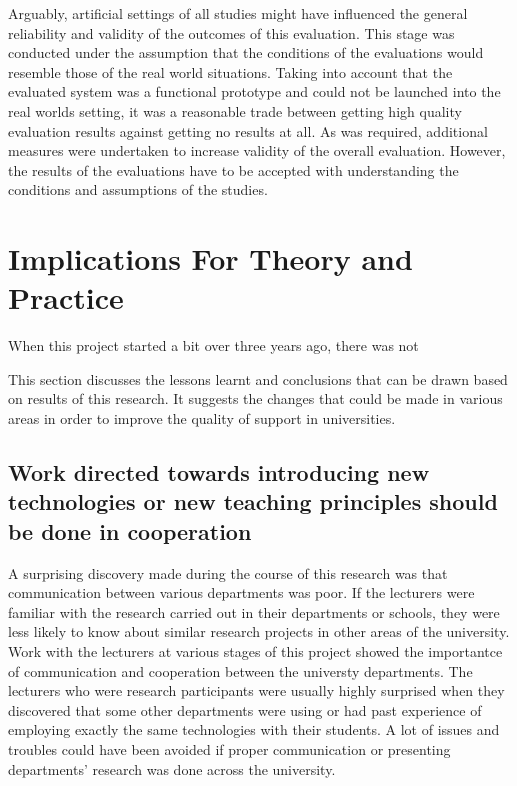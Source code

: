 Arguably, artificial settings of all studies might have influenced the general
reliability and validity of the outcomes of this evaluation. This stage was
conducted under the assumption that the conditions of the evaluations would
resemble those of the real world situations. Taking into account that the
evaluated system was a functional prototype and could not be launched into the
real worlds setting, it was a reasonable trade between getting high quality
evaluation results against getting no results at all. As was required,
additional measures were undertaken to increase validity of the overall
evaluation. However, the results of the evaluations have to be accepted with
understanding the conditions and assumptions of the studies.

\section{Implications For Theory and Practice}

When this project started a bit over three years ago, there was not 


This section discusses the lessons learnt and conclusions that can be drawn
based on results of this research. It suggests the changes that could be made in
various areas in order to improve the quality of \LLLs support in universities.

\subsection[Cooperation and Communication]{Work directed towards introducing
new technologies or new teaching principles should be done in cooperation}

A surprising discovery made during the course of this research was that
communication between various departments was poor. If the lecturers were
familiar with the research carried out in their departments or schools, they
were less likely to know about similar research projects in other areas of
the university. Work with the lecturers at various stages of this project showed
the importantce of communication and cooperation between the universty
departments. The lecturers who were research participants were usually highly
surprised when they discovered that some other departments were using or had
past experience of employing exactly the same technologies with their students.
A lot of issues and troubles could have been avoided if proper communication or
presenting departments' research was done across the university.

